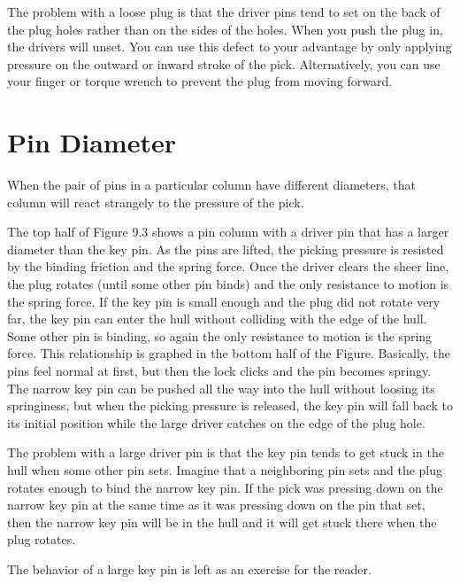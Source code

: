 The problem with a loose plug is that the driver pins tend to set on the back of the plug 
holes rather than on the sides of the holes. When you push the plug in, the drivers will 
unset. You can use this defect to your advantage by only applying pressure on the outward 
or inward stroke of the pick. Alternatively, you can use your finger or torque wrench to 
prevent the plug from moving forward. 

\section{Pin Diameter}
When the pair of pins in a particular column have different diameters, that column will react 
strangely to the pressure of the pick. 

The top half of Figure 9.3 shows a pin column with a driver pin that has a larger diameter 
than the key pin. As the pins are lifted, the picking pressure is resisted by the binding friction 
and the spring force. Once the driver clears the sheer line, the plug rotates (until some other 
pin binds) and the only resistance to motion is the spring force. If the key pin is small enough 
and the plug did not rotate very far, the key pin can enter the hull without colliding with 
the edge of the hull. Some other pin is binding, so again the only resistance to motion is the 
spring force. This relationship is graphed in the bottom half of the Figure. Basically, the 
pins feel normal at first, but then the lock clicks and the pin becomes springy. The narrow 
key pin can be pushed all the way into the hull without loosing its springiness, but when the 
picking pressure is released, the key pin will fall back to its initial position while the large 
driver catches on the edge of the plug hole. 

The problem with a large driver pin is that the key pin tends to get stuck in the hull 
when some other pin sets. Imagine that a neighboring pin sets and the plug rotates enough 
to bind the narrow key pin. If the pick was pressing down on the narrow key pin at the same 
time as it was pressing down on the pin that set, then the narrow key pin will be in the hull 
and it will get stuck there when the plug rotates. 

The behavior of a large key pin is left as an exercise for the reader. 

